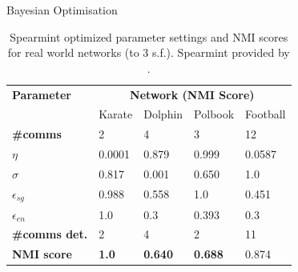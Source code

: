 \documentclass{beamer}
\begin{document}
	\begin{frame}{Bayesian Optimisation}
		\begin{table}
			\centering
			\begin{tabular}{l l l l l}
				\bottomrule
				\textbf{Parameter} & \multicolumn{4}{c}{\textbf{Network (NMI Score)}} \\
				{} & Karate & Dolphin & Polbook & Football \\
				\bottomrule
				\textbf{\#comms} & 2 & 4 & 3 & 12 \\
				\bottomrule 
				$\eta$ & 0.0001 & 0.879 & 0.999 & 0.0587 \\
				$\sigma$ & 0.817 & 0.001 & 0.650 & 1.0 \\
				$\epsilon_{sg}$ & 0.988 & 0.558 & 1.0 &  0.451 \\
				$\epsilon_{en}$ & 1.0 & 0.3 & 0.393 & 0.3 \\
				\bottomrule
				\textbf{\#comms det.} & 2 & 4 & 2 & 11 \\
				\textbf{NMI score} & \textbf{1.0} & \textbf{0.640} & \textbf{0.688} & 0.874 \\
				\bottomrule
			\end{tabular}
			\caption{Spearmint optimized parameter settings and NMI scores for real world networks (to 3 s.f.). Spearmint provided by \protect\cite{snoek2012practical}.}
			\label{bayes}
		\end{table}	
	\end{frame}
	
\end{document}

